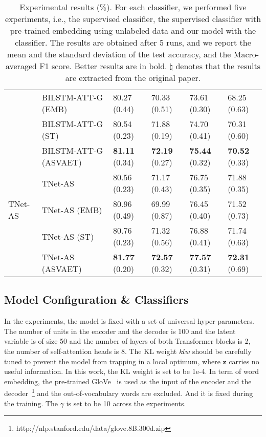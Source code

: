 \documentclass[11pt,a4paper]{article}
\begin{document}
\begin{table*}
{\begin{tabular}{l l l l l l }
			& BILSTM-ATT-G (EMB) & 80.27 (0.44) & 70.33 (0.51) & 73.61 (0.30) & 68.25 (0.63) \\
			& BILSTM-ATT-G (ST) & 80.54 (0.23) & 71.88 (0.19) & 74.70 (0.41)  & 70.31 (0.60)\\
& BILSTM-ATT-G (ASVAET) & \textbf{81.11} (0.34) & \textbf{72.19} (0.27)  & \textbf{75.44} (0.32)  &  \textbf{70.52} (0.33)\\
			\hline
			\multirow{3}{*}{TNet-AS}
			& TNet-AS & 80.56 (0.23) & 71.17 (0.43) & 76.75 (0.35) & 71.88 (0.35) \\
			& TNet-AS (EMB) & 80.96 (0.49) & 69.99 (0.87) & 76.45 (0.40) & 71.52 (0.73) \\
			& TNet-AS (ST) & 80.76 (0.23) & 71.32 (0.56) & 76.88 (0.41)  & 71.74 (0.63)\\
			& TNet-AS (ASVAET) &\textbf{81.77} (0.20) & \textbf{72.57} (0.32) & \textbf{77.57} (0.31) & \textbf{72.31} (0.69) \\
			\hline
		\end{tabular}
	}
	\caption{Experimental results (\%). For each classifier, we performed five experiments, i.e., the supervised classifier, the supervised classifier with pre-trained embedding using unlabeled data and our model with the classifier. The results are obtained after 5 runs, and we report the mean and the standard deviation of the test accuracy, and the Macro-averaged F1 score. Better results are in bold. $\natural$ denotes that the results are extracted from the original paper.}
	\label{tab:results}
\end{table*}



\subsection{Model Configuration \& Classifiers}
In the experiments, the model is fixed with a set of universal hyper-parameters.
The number of units in the encoder and the decoder is 100 and the latent variable is of size 50 and the number of layers of both Transformer blocks is 2, the number of self-attention heads is 8.
The KL weight $klw$ should be carefully tuned to prevent the model from trapping in a local optimum, where $\mathbf{z}$ carries no useful information.
In this work, the KL weight is set to be 1e-4.
In term of word embedding, the pre-trained GloVe~\cite{DBLP:conf/emnlp/PenningtonSM14} is used as the input of the encoder and the decoder~\footnote{http://nlp.stanford.edu/data/glove.8B.300d.zip} and the out-of-vocabulary words are excluded.
And it is fixed during the training.
The $\gamma$ is set to be 10 across the experiments.
\end{document}
